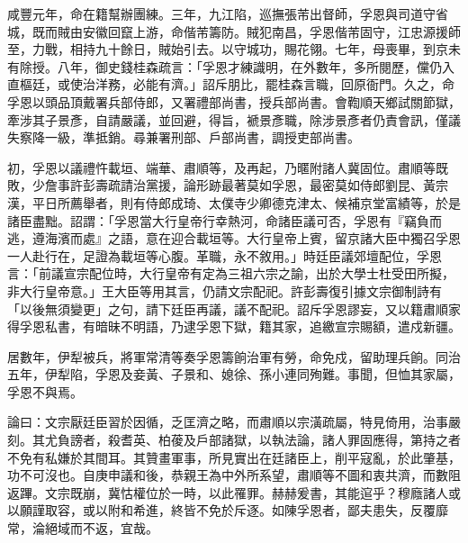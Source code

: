 \begin{pinyinscope}
咸豐元年，命在籍幫辦團練。三年，九江陷，巡撫張芾出督師，孚恩與司道守省城，既而賊由安徽回竄上游，命偕芾籌防。賊犯南昌，孚恩偕芾固守，江忠源援師至，力戰，相持九十餘日，賊始引去。以守城功，賜花翎。七年，母喪畢，到京未有除授。八年，御史錢桂森疏言：「孚恩才練識明，在外數年，多所閱歷，儻仍入直樞廷，或使治洋務，必能有濟。」詔斥朋比，罷桂森言職，回原衙門。久之，命孚恩以頭品頂戴署兵部侍郎，又署禮部尚書，授兵部尚書。會鞫順天鄉試關節獄，牽涉其子景彥，自請嚴議，並回避，得旨，褫景彥職，除涉景彥者仍責會訊，僅議失察降一級，準抵銷。尋兼署刑部、戶部尚書，調授吏部尚書。

初，孚恩以議禮忤載垣、端華、肅順等，及再起，乃暱附諸人冀固位。肅順等既敗，少詹事許彭壽疏請治黨援，論形跡最著莫如孚恩，最密莫如侍郎劉昆、黃宗漢，平日所薦舉者，則有侍郎成琦、太僕寺少卿德克津太、候補京堂富績等，於是諸臣盡黜。詔謂：「孚恩當大行皇帝行幸熱河，命諸臣議可否，孚恩有『竊負而逃，遵海濱而處』之語，意在迎合載垣等。大行皇帝上賓，留京諸大臣中獨召孚恩一人赴行在，足證為載垣等心腹。革職，永不敘用。」時廷臣議郊壇配位，孚恩言：「前議宣宗配位時，大行皇帝有定為三祖六宗之諭，出於大學士杜受田所擬，非大行皇帝意。」王大臣等用其言，仍請文宗配祀。許彭壽復引據文宗御制詩有「以後無須變更」之句，請下廷臣再議，議不配祀。詔斥孚恩謬妄，又以籍肅順家得孚恩私書，有暗昧不明語，乃逮孚恩下獄，籍其家，追繳宣宗賜額，遣戍新疆。

居數年，伊犁被兵，將軍常清等奏孚恩籌餉治軍有勞，命免戍，留助理兵餉。同治五年，伊犁陷，孚恩及妾黃、子景和、媳徐、孫小連同殉難。事聞，但恤其家屬，孚恩不與焉。

論曰：文宗厭廷臣習於因循，乏匡濟之略，而肅順以宗潢疏屬，特見倚用，治事嚴刻。其尤負謗者，殺耆英、柏葰及戶部諸獄，以執法論，諸人罪固應得，第持之者不免有私嫌於其間耳。其贊畫軍事，所見實出在廷諸臣上，削平寇亂，於此肇基，功不可沒也。自庚申議和後，恭親王為中外所系望，肅順等不圖和衷共濟，而數阻返蹕。文宗既崩，冀怙權位於一時，以此罹罪。赫赫爰書，其能逭乎？穆廕諸人或以願謹取容，或以附和希進，終皆不免於斥逐。如陳孚恩者，鄙夫患失，反覆靡常，淪絕域而不返，宜哉。


\end{pinyinscope}